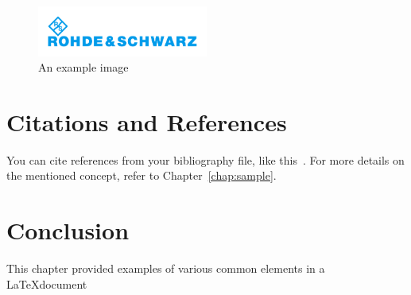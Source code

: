 \begin{figure}[h]
    \centering
    \includegraphics[width=0.5\textwidth]{figures/logos/X_logo_RS.pdf}
    \caption{An example image}
    \label{fig:example}
\end{figure}

\section{Citations and References}
You can cite references from your bibliography file, like this~\cite{sampleArticle}. For more details on the mentioned concept, refer to Chapter~\ref{chap:sample}.

\section{Conclusion}
This chapter provided examples of various common elements in a \LaTeX document